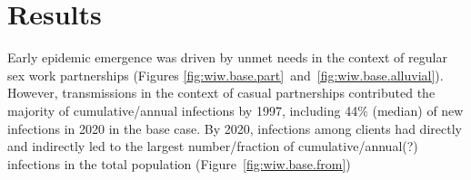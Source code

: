 \section{Results}\label{art.res} %
Early epidemic emergence was driven by unmet needs in the context of regular sex work partnerships  %
(Figures \ref{fig:wiw.base.part}~and~\ref{fig:wiw.base.alluvial}).
However, transmissions in the context of casual partnerships contributed the majority of cumulative/annual infections by 1997, %
including 44\% (median) of new infections in 2020 in the base case. %
By 2020, infections among clients had directly and indirectly led to the largest number/fraction of cumulative/annual(?) infections in the total population (Figure~\ref{fig:wiw.base.from}) %
